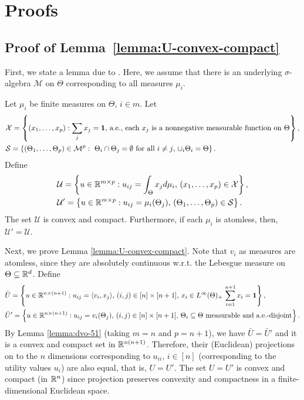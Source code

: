 
\section{Proofs} \label{app:proofs}

	\subsection*{Proof of Lemma~\ref{lemma:U-convex-compact}}

	First, we state a lemma due to \citet[Theorems 1 and 4]{dvoretzky1951relations}. Here, we assume that there is an underlying $\sigma$-algebra $\mathcal{M}$ on $\Theta$ corresponding to all measures $\mu_i$.
	\begin{lemma}
		Let $\mu_i$ be finite measures on $\Theta$, $i\in m$. 
		Let 
		\begin{align*}
			& \mathcal{X} = \left\{ (x_1, \dots, x_p): \sum_j x_j = \mathbf{1}, \, \textnormal{a.e.},\, \text{each $x_j$ is a nonnegative measurable function on $\Theta$} \right\}, \\
			& \mathcal{S} = \left\{ (\Theta_1, \dots, \Theta_p) \in \mathcal{M}^p: \text{ $\Theta_i \cap \Theta_j = \emptyset$ for all $i\neq j$, $\cup_i \Theta_i = \Theta$}\right\}.
		\end{align*}
		Define 
		\begin{align*}
			& \mathcal{U} = \left\{ u\in \mathbb{R}^{m\times p}: u_{ij} = \int_{\Theta} x_j d\mu_i,\, (x_1, \dots, x_p)\in\mathcal{X} \right\}, \\
			& \mathcal{U}' = \left\{ u\in \mathbb{R}^{m\times p}: u_{ij} = \mu_i(\Theta_j),\, (\Theta_1, \dots, \Theta_p) \in \mathcal{S} \right\}.
		\end{align*}
		The set $\mathcal{U}$ is convex and compact. Furthermore, if each $\mu_i$ is atomless, then, $\mathcal{U}' = \mathcal{U}$.
		\label{lemma:dvo-51}
	\end{lemma}

	Next, we prove Lemma \ref{lemma:U-convex-compact}.
	Note that $v_i$ as measures are atomless, since they are absolutely continuous w.r.t. the Lebesgue measure on $\Theta\subseteq \mathbb{R}^d$.
	Define 
	\begin{align*}
		& \bar{U} = \left\{ u \in \mathbb{R}^{n\times (n+1)}: u_{ij} = \langle v_i, x_j\rangle,\, (i,j)\in [n]\times [n+1],\, x_i \in L^\infty(\Theta)_+\, \sum_{i=1}^{n+1} x_i = \mathbf{1} \right\}, \\ 
		& \bar{U}' = \left\{ u \in \mathbb{R}^{n\times (n+1)}: u_{ij} = v_i(\Theta_j),\, (i,j)\in [n]\times [n+1],\, \textnormal{$\Theta_i\subseteq \Theta$ measurable and a.e.-disjoint}\right\}.
	\end{align*}
	By Lemma \ref{lemma:dvo-51} (taking $m=n$ and $p=n+1$), we have $\bar{U} = \bar{U}'$
	and it is a convex and compact set in $\mathbb{R}^{n(n+1)}$.
	Therefore, their (Euclidean) projections on to the $n$ dimensions corresponding to $u_{ii}$, $i\in [n]$ (corresponding to the utility values $u_i$) are also equal, that is, 
	$U = U'$.
	The set $U=U'$ is convex and compact (in $\mathbb{R}^n$) since projection preserves convexity and compactness in a finite-dimensional Euclidean space.

